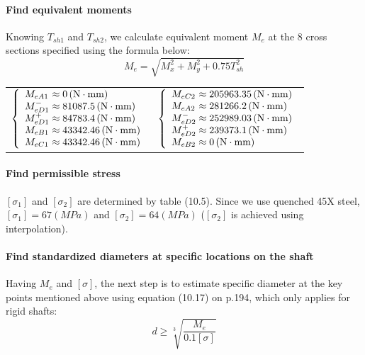 \paragraph{Find equivalent moments} Knowing $ T_{sh1} $ and $ T_{sh2} $, we calculate equivalent moment $ M_e $ at the 8 cross sections specified using the formula below:
\[M_e = \sqrt{M_x^2 + M_y^2 + 0.75T_{sh}^2}\]

\begin{tabular}{p{7cm}p{7cm}}
	$
	\left\{ 
	\begin{array}{l@{{} \approx {}}l}
	M_{eA1} & 0 \unit{(N\cdot mm)}\\
	M_{eD1}^- & 81087.5 \unit{(N\cdot mm)}\\
	M_{eD1}^+ & 84783.4 \unit{(N\cdot mm)}\\
	M_{eB1} & 43342.46 \unit{(N\cdot mm)}\\
	M_{eC1} & 43342.46 \unit{(N\cdot mm)}\\
	\end{array}
	\right.
	$ &
	$
	\left\{ 
	\begin{array}{l@{{} \approx {}}l}
	M_{eC2} & 205963.35 \unit{(N\cdot mm)}\\
	M_{eA2} & 281266.2 \unit{(N\cdot mm)}\\
	M_{eD2}^- & 252989.03 \unit{(N\cdot mm)}\\
	M_{eD2}^+ & 239373.1 \unit{(N\cdot mm)}\\
	M_{eB2} & 0 \unit{(N\cdot mm)}\\
	\end{array}
	\right.
	$
\end{tabular}\vskip2mm

\paragraph{Find permissible stress}
$ [\sigma_1] $ and $ [\sigma_2] $ are determined by table (10.5). Since we use quenched 45X steel, $ [\sigma_1] = 67 \unit{(MPa)}$ and $ [\sigma_2] = 64 \unit{(MPa)}$ ($ [\sigma_2] $ is achieved using interpolation).

\paragraph{Find standardized diameters at specific locations on the shaft} Having $ M_e $ and $ [\sigma] $, the next step is to estimate specific diameter at the key points mentioned above using equation (10.17) on p.194, which only applies for rigid shafts:
\[d \geq \sqrt[3]{\dfrac{M_e}{0.1[\sigma]}}\]

